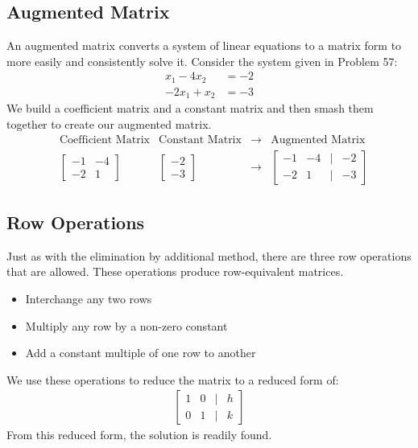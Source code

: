 \documentclass[14pt]{extarticle}
\begin{document}
\subsection*{Augmented Matrix}
An augmented matrix converts a system of linear equations to a matrix form to more easily and consistently solve it. Consider the system given in Problem 57:
\begin{align*}
	x_1 - 4x_2 &= -2 \\
	-2x_1 + x_2 &= -3
\end{align*}
We build a coefficient matrix and a constant matrix and then smash them together to create our augmented matrix.
\begin{align*}
	&\text{Coefficient Matrix} &\text{Constant Matrix} & \to &\text{Augmented Matrix} \\
	&\begin{bmatrix}
		-1 & -4 \\
		-2 & 1
	\end{bmatrix} 
	&\begin{bmatrix}
		-2 \\
		-3
	\end{bmatrix}
	& \to &\begin{bmatrix}
		-1 & -4 & | & -2\\
		-2 & 1 & | & -3
	\end{bmatrix}
\end{align*}

\subsection*{Row Operations}
Just as with the elimination by additional method, there are three row operations that are allowed. These operations produce row-equivalent matrices.
\begin{itemize}
	\item Interchange any two rows
	\item Multiply any row by a non-zero constant
	\item Add a constant multiple of one row to another
\end{itemize}
We use these operations to reduce the matrix to a reduced form of:
\begin{align*}
	\begin{bmatrix}
		1 & 0 & | & h \\
		0 & 1 & | & k
	\end{bmatrix}
\end{align*}
From this reduced form, the solution is readily found.
\end{document}
